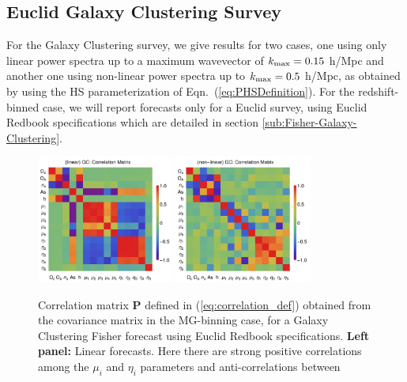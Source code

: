 \subsection{\label{sub:GC-Correlations}Euclid Galaxy Clustering Survey}


For the Galaxy Clustering survey, we give results for two cases, one
using only linear power spectra up to a maximum wavevector of $k_{\rm max}=0.15$
h/Mpc and another one using non-linear power spectra up to $k_{\rm max}=0.5$
h/Mpc, as obtained by using the HS parameterization of
Eqn.\ (\ref{eq:PHSDefinition}).
For the redshift-binned case, we will report forecasts only for a Euclid survey, 
using Euclid Redbook specifications which
are detailed in section \ref{sub:Fisher-Galaxy-Clustering}.

\begin{figure}[H]
\centering
\includegraphics[width=0.4\textwidth]{Chapters/linear-nonlinear-MG-forecasts/figures/Decorrelations-GC/correlation-full-fiducialMGBin3-Euclid-GC-linearPK-}
\includegraphics[width=0.4\textwidth]{Chapters/linear-nonlinear-MG-forecasts/figures/Decorrelations-GC/correlation-full-fiducialMGBin3-Euclid-GC-nonlinearPk__Zhao-}
\caption[Correlation matrices for a Euclid Galaxy Clustering forecast.]{\label{fig:GCcorr}
Correlation matrix $\mathbf P$ defined in (\ref{eq:correlation_def}) obtained from the covariance matrix in the MG-binning case, for a Galaxy Clustering Fisher forecast using Euclid
Redbook specifications. \textbf{Left panel:}
Linear forecasts. Here there are strong positive correlations among the $\mu_i$ and $\eta_i$ parameters and anti-correlations between
}
\end{figure}
